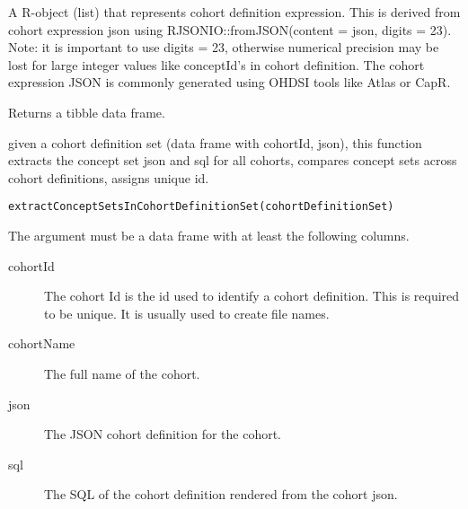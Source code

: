\documentclass[a4paper]{book}
\begin{document}
%
\begin{Arguments}
\begin{ldescription}
\item[\code{cohortExpression}] A R-object (list) that represents cohort definition expression. This is derived from cohort expression json 
using RJSONIO::fromJSON(content = json, digits = 23). Note: it is important to use digits = 23, otherwise
numerical precision may be lost for large integer values like conceptId's in cohort definition. The cohort
expression JSON is commonly generated using OHDSI tools like Atlas or CapR.
\end{ldescription}
\end{Arguments}
%
\begin{Value}
Returns a tibble data frame.
\end{Value}
%
\begin{Description}\relax
given a cohort definition set (data frame with cohortId, json), this function
extracts the concept set json and sql for all cohorts,
compares concept sets across cohort definitions, assigns unique id.
\end{Description}
%
\begin{Usage}
\begin{verbatim}
extractConceptSetsInCohortDefinitionSet(cohortDefinitionSet)
\end{verbatim}
\end{Usage}
%
\begin{Arguments}
\begin{ldescription}
\item[\code{cohortDefinitionSet}] The  argument must be a data frame 
with at least the following columns. 
\begin{description}

\item[cohortId] The cohort Id is the id used to identify  a 
cohort definition. This is required to be unique. 
It is usually used to create file names.
\item[cohortName] The full name of the cohort.
\item[json] The JSON cohort definition for the cohort.
\item[sql] The SQL of the cohort definition rendered from the cohort json.

\end{description}

\end{ldescription}
\end{Arguments}
\end{document}
